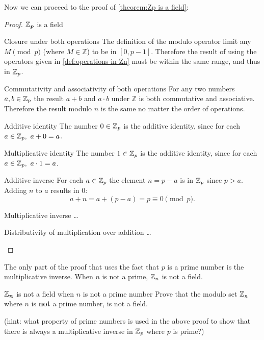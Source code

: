 Now we can proceed to the proof of \autoref{theorem:Zp is a field}:

\begin{proof}{$\bm{\mathbb{Z}_{p}}$ is a field}{}
	\begin{descitemize}
	\item[Closure under both operations] The definition of the modulo operator limit any $M\pmod{p}$ (where $M\in\mathbb{Z}$) to be in $[0,p-1]$. Therefore the result of using the operators given in \autoref{def:operations in Zn} must be within the same range, and thus in $\mathbb{Z}_{p}$.

	\item[Commutativity and associativity of both operations] For any two numbers $a,b\in\mathbb{Z}_{p}$ the result $a+b$ and $a\cdot b$ under $\mathbb{Z}$ is both commutative and associative. Therefore the result modulo $n$ is the same no matter the order of operations.

	\item[Additive identity] The number $0\in\mathbb{Z}_{p}$ is the additive identity, since for each $a\in\mathbb{Z}_{p},\ a+0=a$.
	
	\item[Multiplicative identity] The number $1\in\mathbb{Z}_{p}$ is the additive identity, since for each $a\in\mathbb{Z}_{p},\ a\cdot1=a$.

	\item[Additive inverse] For each $a\in\mathbb{Z}_{p}$ the element $n=p-a$ is in $\mathbb{Z}_{p}$ since $p>a$. Adding $n$ to $a$ results in $0$:
		\[
			a+n = a+(p-a) = p \equiv 0\pmod{p}.
		\]
	
	\item[Multiplicative inverse] \ldots
	
	\item[Distributivity of multiplication over addition] \ldots
	\end{descitemize}
\end{proof}

The only part of the proof that uses the fact that $p$ is a prime number is the multiplicative inverse. When $n$ is not a prime, $\mathbb{Z}_{n}$ is not a field.

\begin{challange}{$\bm{\mathbb{Z}_{n}}$ is not a field when $n$ is not a prime number}{}
	Prove that the modulo set $\mathbb{Z}_{n}$ where $n$ is \textbf{not} a prime number, is not a field.

	(hint: what property of prime numbers is used in the above proof to show that there is always a multiplicative inverse in $\mathbb{Z}_{p}$ where $p$ is prime?)
\end{challange}
